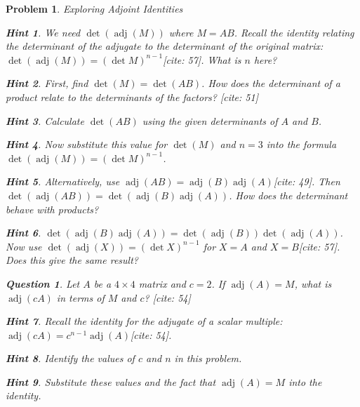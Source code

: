 \documentclass[12pt]{article}
\newtheorem{problem}{Problem}[section]
\newtheorem{question}{Question}[problem]
\theoremstyle{definition}
\newtheorem{hint}{Hint}[question]
\newcommand{\adj}{\operatorname{adj}}
\newcommand{\detm}{\operatorname{det}}
\begin{document}
\begin{problem}{Exploring Adjoint Identities}
        \begin{hint}
            We need $\detm(\adj(M))$ where $M=AB$. Recall the identity relating the determinant of the adjugate to the determinant of the original matrix: $\detm(\adj(M)) = (\detm M)^{n-1}$[cite: 57]. What is $n$ here?
        \end{hint}
        \begin{hint}
            First, find $\detm(M) = \detm(AB)$. How does the determinant of a product relate to the determinants of the factors? [cite: 51]
        \end{hint}
        \begin{hint}
            Calculate $\detm(AB)$ using the given determinants of $A$ and $B$.
        \end{hint}
        \begin{hint}
            Now substitute this value for $\detm(M)$ and $n=3$ into the formula $\detm(\adj(M)) = (\detm M)^{n-1}$.
        \end{hint}
        \begin{hint}
            Alternatively, use $\adj(AB) = \adj(B)\adj(A)$[cite: 49]. Then $\detm(\adj(AB)) = \detm(\adj(B)\adj(A))$. How does the determinant behave with products?
        \end{hint}
        \begin{hint}
            $\detm(\adj(B)\adj(A)) = \detm(\adj(B)) \detm(\adj(A))$. Now use $\detm(\adj(X)) = (\detm X)^{n-1}$ for $X=A$ and $X=B$[cite: 57]. Does this give the same result?
        \end{hint}
    

    \begin{question}
        Let $A$ be a $4 \times 4$ matrix and $c=2$. If $\adj(A) = M$, what is $\adj(cA)$ in terms of $M$ and $c$? [cite: 54]
    \end{question}
    
        \begin{hint}
            Recall the identity for the adjugate of a scalar multiple: $\adj(cA) = c^{n-1} \adj(A)$[cite: 54].
        \end{hint}
        \begin{hint}
            Identify the values of $c$ and $n$ in this problem.
        \end{hint}
        \begin{hint}
            Substitute these values and the fact that $\adj(A)=M$ into the identity.
        \end{hint}
    


\end{problem}
\end{document}
